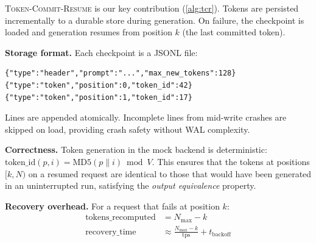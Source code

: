 \documentclass[10pt,twocolumn]{article}
\newcommand{\tcr}{\textsc{Token-Commit-Resume}}
\begin{document}
\tcr{} is our key contribution (\autoref{alg:tcr}). Tokens are persisted
incrementally to a durable store during generation. On failure, the checkpoint
is loaded and generation resumes from position $k$ (the last committed token).

\begin{algorithm}
\caption{Token-Commit-Resume}
\label{alg:tcr}
\begin{algorithmic}[1]
  \State $\text{store.initialize}(\text{request\_id})$
    \State $\text{checkpoint} \gets \text{store.load}(\text{request\_id})$
    \State $k \gets |\text{checkpoint.tokens}|$
    \State $\text{resume\_req} \gets \text{request with resume\_from}[0..k)$
    \Try
      \State $\text{response} \gets \text{generate\_fn}(\text{resume\_req})$
      \State $\text{store.append\_tokens}(\text{response.tokens}[k:])$
      \State $\text{store.delete}(\text{request\_id})$
      \State \Return $\text{RecoveryResult}(\text{success}=\top)$
      \State $k' \gets |\text{store.load}(\text{request\_id}).tokens}|$
      \State $\text{tokens\_recomputed} \gets N_{\max} - k'$
      \State $\text{sleep}(\text{backoff})$
    \EndTry
  \EndFor
  \State \Return $\text{RecoveryResult}(\text{success}=\bot)$
\EndProcedure
\end{algorithmic}
\end{algorithm}

\textbf{Storage format.} Each checkpoint is a JSONL file:

\begin{lstlisting}
{"type":"header","prompt":"...","max_new_tokens":128}
{"type":"token","position":0,"token_id":42}
{"type":"token","position":1,"token_id":17}
\end{lstlisting}

Lines are appended atomically. Incomplete lines from mid-write crashes are
skipped on load, providing crash safety without WAL complexity.

\textbf{Correctness.} Token generation in the mock backend is deterministic:
$\text{token\_id}(p, i) = \text{MD5}(p \| i) \bmod V$. This ensures that
the tokens at positions $[k, N)$ on a resumed request are identical to those
that would have been generated in an uninterrupted run, satisfying the
\textit{output equivalence} property.

\textbf{Recovery overhead.} For a request that fails at position $k$:
\begin{align}
\text{tokens\_recomputed} &= N_{\max} - k \\
\text{recovery\_time} &\approx \frac{N_{\max} - k}{\text{tps}} + t_{\text{backoff}}
\end{align}
\end{document}
